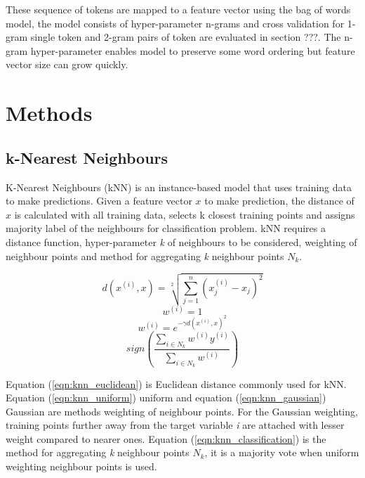 \documentclass[transmag]{IEEEtran}
\begin{document}
\noindent These sequence of tokens are mapped to a feature vector using the bag of words model, the model consists of hyper-parameter n-grams and cross validation for 1-gram single token and 2-gram pairs of token are evaluated in section ???. The n-gram hyper-parameter enables model to preserve some word ordering but feature vector size can grow quickly.

\section{Methods}
\label{methods}

\subsection{k-Nearest Neighbours}
\noindent K-Nearest Neighbours (kNN) is an instance-based model that uses training data to make predictions. Given a feature vector $x$ to make prediction, the distance of $x$ is calculated with all training data, selects k closest training points and assigns majority label of the neighbours for classification problem. kNN requires a distance function, hyper-parameter \emph{k} of neighbours to be considered, weighting of neighbour points and method for aggregating \emph{k} neighbour points $N_k$. 


\begin{equation}
\label{eqn:knn_euclidean}
d(x^{(i)},x) = \sqrt[2]{ \sum^n_{j=1} (x^{(i)}_j - x_j)^2 }
\end{equation}
\begin{equation}
\label{eqn:knn_uniform}
w^{(i)} = 1
\end{equation}
\begin{equation}
\label{eqn:knn_gaussian}
w^{(i)} = e^{-\gamma d(x^{(i)},x)^2}
\end{equation}
\begin{equation}
\label{eqn:knn_classification}
sign(\frac{ \sum_{i \in N_k} w^{(i)} y^{(i)} }{ \sum_{ i \in N_k} w^{(i)} })
\end{equation}

\noindent Equation (\ref{eqn:knn_euclidean}) is Euclidean distance commonly used for kNN.
Equation (\ref{eqn:knn_uniform}) uniform and equation (\ref{eqn:knn_gaussian}) Gaussian are methods weighting of neighbour points. For the Gaussian weighting, training points further away from the target variable \emph{i} are attached with lesser weight compared to nearer ones. Equation (\ref{eqn:knn_classification}) is the method for aggregating \emph{k} neighbour points $N_k$, it is a majority vote when uniform weighting neighbour points is used.
\end{document}
